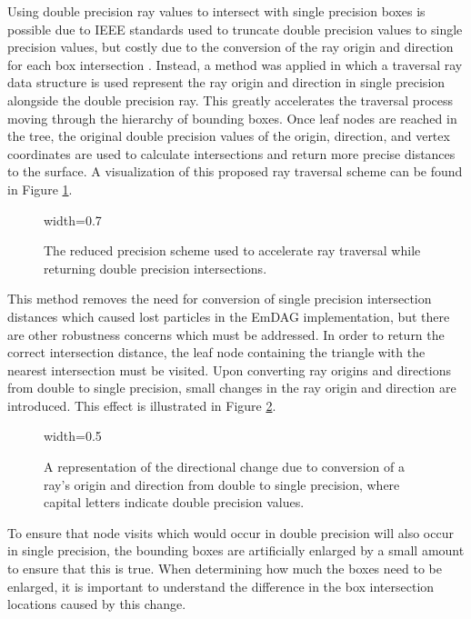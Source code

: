 Using double precision ray values to intersect with single precision boxes is
possible due to IEEE standards used to truncate double precision values to
single precision values, but costly due to the conversion of the ray origin and
direction for each box intersection \cite{IEEE_STD_2008}. Instead, a method was
applied in which a traversal ray data structure is used represent the ray origin
and direction in single precision alongside the double precision ray. This
greatly accelerates the traversal process moving through the hierarchy of
bounding boxes. Once leaf nodes are reached in the tree, the original double
precision values of the origin, direction, and vertex coordinates are used to
calculate intersections and return more precise distances to the surface. A
visualization of this proposed ray traversal scheme can be found in Figure
\ref{fig:reduced_precision_scheme}.

\begin{figure}[H]
  \centering
  {width=0.7\textwidth}
  \caption[Depiction of reduced precision ray tracing scheme.]{The reduced
    precision scheme used to accelerate ray traversal while returning double
    precision intersections.}
  \label{fig:reduced_precision_scheme}
\end{figure}

This method removes the need for conversion of single precision intersection
distances which caused lost particles in the EmDAG implementation, but there are
other robustness concerns which must be addressed. In order to return the
correct intersection distance, the leaf node containing the triangle with the
nearest intersection must be visited. Upon converting ray origins and directions
from double to single precision, small changes in the ray origin and direction
are introduced. This effect is illustrated in Figure
\ref{fig:double_to_single_ray}.

\begin{figure}[H]
  \centering
  {width=0.5\textwidth}
  \caption[Reduced precision directional alterations.]{A representation of the
    directional change due to conversion of a ray's origin and direction from
    double to single precision, where capital letters indicate double precision
    values.}
  \label{fig:double_to_single_ray}
\end{figure}

To ensure that node visits which would occur in double precision will also occur
in single precision, the bounding boxes are artificially enlarged by a small
amount to ensure that this is true. When determining how much the boxes need to
be enlarged, it is important to understand the difference in the box intersection
locations caused by this change.


